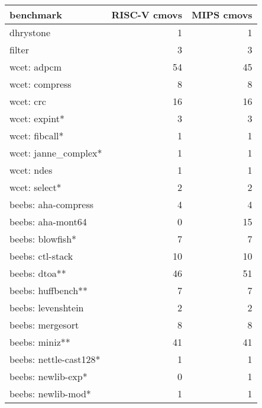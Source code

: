 \documentclass[12pt,twoside,notitlepage]{report}
\begin{document}
\begin{table}
\begin{tabular}{lrr}

	benchmark & RISC-V cmovs & MIPS cmovs \\
\hline
	dhrystone & 1 & 1\\

	filter & 3 & 3\\
	
	wcet: adpcm & 54 & 45\\

	wcet: compress & 8 & 8\\
	
	wcet: crc & 16 & 16\\
	
	wcet: expint* & 3 & 3\\

	wcet: fibcall* & 1 & 1\\

	wcet: janne\_complex* & 1 & 1\\

	wcet: ndes & 1 & 1\\

	wcet: select* & 2 & 2\\
	
	beebs: aha-compress & 4 & 4\\
	
	beebs: aha-mont64 & 0 & 15\\
	
	beebs: blowfish* & 7 & 7\\
	
	beebs: ctl-stack & 10 & 10\\
	
	beebs: dtoa** & 46 & 51\\
	
	beebs: huffbench** & 7 & 7\\
	
	beebs: levenshtein & 2 & 2\\
	
	beebs: mergesort & 8 & 8\\
	
	beebs: miniz** & 41 & 41\\
	
	beebs: nettle-cast128* & 1 & 1\\
	
	beebs: newlib-exp* & 0 & 1\\
	
	beebs: newlib-mod* & 1 & 1\\
	

\end{tabular}
\end{table}
\end{document}
